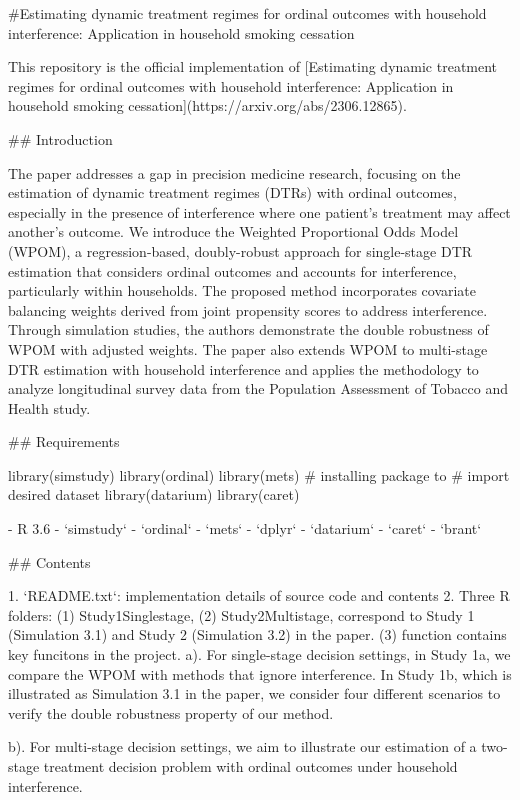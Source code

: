 #Estimating dynamic treatment regimes for ordinal outcomes with household interference: Application in household smoking cessation


This repository is the official implementation of [Estimating dynamic treatment regimes for ordinal outcomes with household interference: Application in household smoking cessation](https://arxiv.org/abs/2306.12865).

## Introduction

The paper addresses a gap in precision medicine research, focusing on the estimation of dynamic treatment regimes (DTRs) with ordinal outcomes, especially in the presence of interference where one patient's treatment may affect another's outcome. We introduce the Weighted Proportional Odds Model (WPOM), a regression-based, doubly-robust approach for single-stage DTR estimation that considers ordinal outcomes and accounts for interference, particularly within households. The proposed method incorporates covariate balancing weights derived from joint propensity scores to address interference. Through simulation studies, the authors demonstrate the double robustness of WPOM with adjusted weights. The paper also extends WPOM to multi-stage DTR estimation with household interference and applies the methodology to analyze longitudinal survey data from the Population Assessment of Tobacco and Health study.

## Requirements

library(simstudy)
library(ordinal)
library(mets)
# installing package to
# import desired dataset
library(datarium)
library(caret)


 - R 3.6
 - `simstudy`
 - `ordinal`
 - `mets`
 - `dplyr`
 - `datarium`
 - `caret`
 - `brant`
 
## Contents

  1. `README.txt`: implementation details of source code and contents 
  2. Three R folders: (1) Study1Singlestage, (2) Study2Multistage, correspond to Study 1 (Simulation 3.1) and Study 2 (Simulation 3.2) in the paper. (3) function contains  key funcitons in the project. 
      a). For single-stage decision settings, in Study 1a, we compare the WPOM with methods that ignore interference. In Study 1b, which is illustrated as Simulation 3.1 in the paper, we consider four different scenarios to verify the double robustness property of our method.

      b). For multi-stage decision settings, we aim to illustrate our estimation of a two-stage treatment decision problem with ordinal outcomes under household interference.      

     
 






